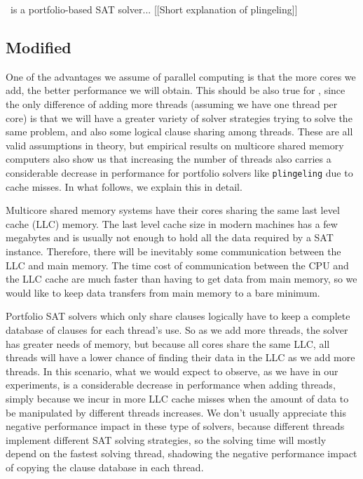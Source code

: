 \pling\ is a portfolio-based SAT solver... [[Short explanation of plingeling]]

\subsection{Modified \pling}
\label{sec:modifiedpling}


One of the advantages we assume of parallel computing is that the more
cores we add, the better performance we will obtain. This should be
also true for \pling, since the only difference of adding more threads
(assuming we have one thread per core) is that we will have a greater
variety of solver strategies trying to solve the same problem, and
also some logical clause sharing among threads. These are all valid
assumptions in theory, but empirical results on multicore shared
memory computers also show us that increasing the number of threads
also carries a considerable decrease in performance for portfolio
solvers like {\tt plingeling} due to cache misses. In what follows, we
explain this in detail.

Multicore shared memory systems have their cores sharing the same last
level cache (LLC) memory. The last level cache size in modern machines
has a few megabytes and is usually not enough to hold all the data
required by a SAT instance. Therefore, there will be inevitably some
communication between the LLC and main memory. The time cost of
communication between the CPU and the LLC cache are much faster than
having to get data from main memory, so we would like to keep data
transfers from main memory to a bare minimum.

Portfolio SAT solvers which only share clauses logically have to keep
a complete database of clauses for each thread's use. So as we add
more threads, the solver has greater needs of memory, but because all
cores share the same LLC, all threads will have a lower chance of
finding their data in the LLC as we add more threads. In this
scenario, what we would expect to observe, as we have in our
experiments, is a considerable decrease in performance when adding
threads, simply because we incur in more LLC cache misses when the
amount of data to be manipulated by different threads increases. We
don't usually appreciate this negative performance impact in these
type of solvers, because different threads implement different SAT
solving strategies, so the solving time will mostly depend on the
fastest solving thread, shadowing the negative performance impact of
copying the clause database in each thread.

